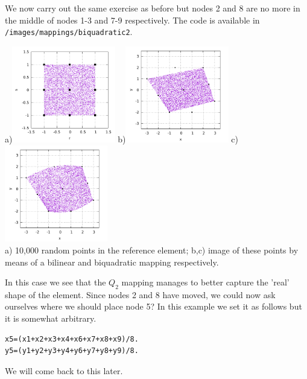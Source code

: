 We now carry out the same exercise as before but nodes 2 and 8 are no more 
in the middle of nodes 1-3 and 7-9 respectively.
The code is available in {\tt /images/mappings/biquadratic2}.

\begin{center}
a)\includegraphics[width=4.5cm]{images/mappings/biquadratic2/rs.pdf}
b)\includegraphics[width=4.5cm]{images/mappings/biquadratic2/xyQ1.pdf}
c)\includegraphics[width=4.5cm]{images/mappings/biquadratic2/xyQ2.pdf}\\
{\captionfont a) 10,000 random points in the reference element; 
b,c) image of these points by means of a bilinear and biquadratic mapping 
respectively.} 
\end{center}

In this case we see that 
the $Q_2$ mapping manages to better capture the 'real' shape of the element.
Since nodes 2 and 8 have moved, we could now ask ourselves 
where we should place node 5? In this example we set it as follows
but it is somewhat arbitrary.
\begin{lstlisting}
x5=(x1+x2+x3+x4+x6+x7+x8+x9)/8. 
y5=(y1+y2+y3+y4+y6+y7+y8+y9)/8.
\end{lstlisting}
We will come back to this later.


